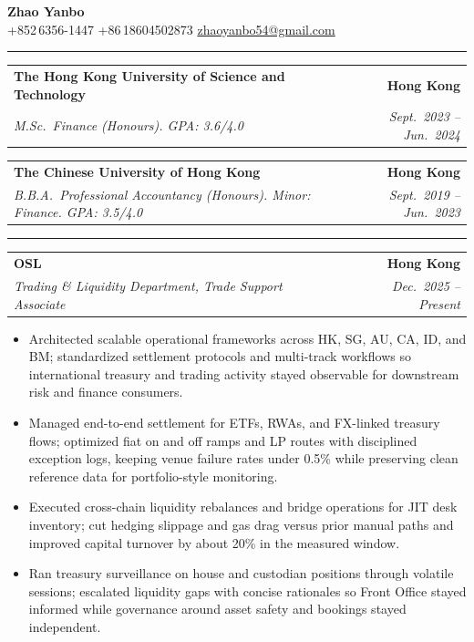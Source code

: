 \documentclass[9pt,a4paper]{extarticle}
\makeatletter
\newcommand{\ressection}[1]{%
  \vspace{0.8em}%
  \noindent{\large\scshape\bfseries #1}\par\nobreak
  \vspace{-\parskip}%
  \vspace{-\parskip}%
  \vspace{-\parskip}%
  \vspace{-\parskip}%
  \noindent\rule{\linewidth}{0.1pt}\par\nobreak
  \vspace{-\parskip}%
}
\newcommand{\resumeSubheading}[4]{%
  \vspace{0.6em}%
  \begin{tabular*}{\textwidth}{l@{\extracolsep{\fill}}r}
    \textbf{#1} & \textbf{#2} \\
    \textit{\small #3} & \textit{\small #4} \\
  \end{tabular*}\vspace{0.32em}}
\makeatother
\begin{document}
\begin{center}
  {\LARGE\bfseries Zhao Yanbo}\\[0.35em]
  \small
  +852\,6356-1447 \;\textbar\;
  +86\,18604502873 \;\textbar\;
  \href{mailto:zhaoyanbo54@gmail.com}{zhaoyanbo54@gmail.com}
\end{center}
\vspace{-0.2em}

\ressection{Education}

\resumeSubheading{The Hong Kong University of Science and Technology}{Hong Kong}{M.Sc.\ Finance (Honours). GPA: 3.6/4.0}{Sept.\ 2023 -- Jun.\ 2024}

\resumeSubheading{The Chinese University of Hong Kong}{Hong Kong}{B.B.A.\ Professional Accountancy (Honours). Minor: Finance. GPA: 3.5/4.0}{Sept.\ 2019 -- Jun.\ 2023}

\ressection{Work Experience}

\resumeSubheading{OSL}{Hong Kong}{Trading \& Liquidity Department, Trade Support Associate}{Dec.\ 2025 -- Present}
\begin{itemize}
  \item Architected scalable operational frameworks across HK, SG, AU, CA, ID, and BM; standardized settlement protocols and multi-track workflows so international treasury and trading activity stayed observable for downstream risk and finance consumers.
  \item Managed end-to-end settlement for ETFs, RWAs, and FX-linked treasury flows; optimized fiat on and off ramps and LP routes with disciplined exception logs, keeping venue failure rates under 0.5\% while preserving clean reference data for portfolio-style monitoring.
  \item Executed cross-chain liquidity rebalances and bridge operations for JIT desk inventory; cut hedging slippage and gas drag versus prior manual paths and improved capital turnover by about 20\% in the measured window.
  \item Ran treasury surveillance on house and custodian positions through volatile sessions; escalated liquidity gaps with concise rationales so Front Office stayed informed while governance around asset safety and bookings stayed independent.
\end{itemize}
\end{document}
